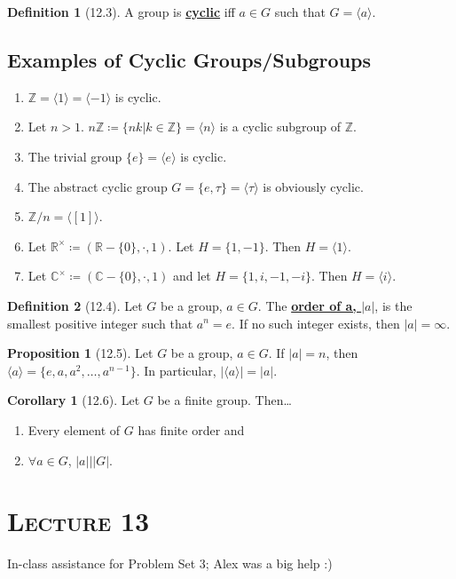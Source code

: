 \documentclass{article}
\newcommand{\Z}{\mathbb{Z}}
\newcommand{\R}{\mathbb{R}}
\newcommand{\C}{\mathbb{C}}
\newcommand{\coleq}{\coloneqq}
\newcommand{\define}[1]{\textbf{\underline{#1}}}
\newcommand{\gen}[1]{\langle#1\rangle}
\theoremstyle{definition}
\newtheorem*{defn}{Definition}
\newtheorem*{cor}{Corollary}
\newtheorem*{prop}{Proposition}
\theoremstyle{remark}
\begin{document}
{{        \begin{defn}[12.3]
            A group is \define{cyclic} iff $a \in G$ such that $G=\gen{a}$.
        \end{defn}
        }
        \subsection*{Examples of Cyclic Groups/Subgroups}{
            \begin{enumerate}
                \item $\Z=\gen{1}=\gen{-1}$ is cyclic.
                \item Let $n>1$. $n\Z\coleq\{nk|k\in\Z\}=\gen{n}$ is a cyclic subgroup of $\Z$.
                \item The trivial group $\{e\}=\gen{e}$ is cyclic.
                \item The abstract cyclic group $G=\{e,\tau\}=\gen{\tau}$ is obviously cyclic.
                \item $\Z/n=\gen{[1]}$.
                \item Let $\R^\times\coleq(\R-\{0\},\cdot,1)$. Let $H=\{1,-1\}$. Then $H=\gen{1}$.
                \item Let $\C^\times\coleq(\C-\{0\},\cdot, 1)$ and let $H=\{1,i,-1,-i\}$. Then $H=\gen{i}$.
            \end{enumerate}
            
            \begin{defn}[12.4]
                Let $G$ be a group, $a\in G$. The \define{order of a, $|a|$}, is the smallest positive integer such that $a^n=e$. If no such integer exists, then $|a|=\infty$.
            \end{defn}
            
            \begin{prop}[12.5]
                Let $G$ be a group, $a\in G$. If $|a|=n$, then $\gen{a}=\{e,a,a^2,\ldots,a^{n-1}\}$. In particular, $|\gen{a}|=|a|$.
            \end{prop}
            
            \begin{cor}[12.6]
                Let $G$ be a finite group. Then\ldots
                \begin{enumerate}
                    \item Every element of $G$ has finite order and
                    \item $\forall a \in G$, $|a|\big||G|$.
                \end{enumerate}
            \end{cor}
        }
        
        \noindent\section*{\textbf{\textsc{Lecture 13}}}{
            In-class assistance for Problem Set 3; Alex was a big help :)
        }
    }
\end{document}
